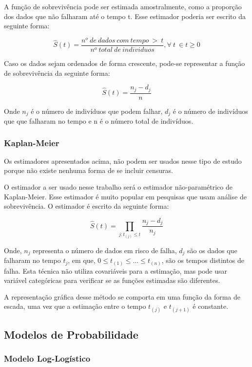 \documentclass[a4paper,12pt]{article}
\begin{document}
A função de sobrevivência pode ser estimada amostralmente, como a proporção dos dados que não falharam até o tempo t. Esse estimador poderia ser escrito da seguinte forma:

$$ \hat{S}(t) = \dfrac{n^o \ de \ dados \ com \ tempo \ > \ t}{n^o \ total \ de \ individuos}, \forall \ t \ \in t\ge 0$$

Caso os dados sejam ordenados de forma crescente, pode-se representar a função de sobrevivência da seguinte forma:

$$ \hat{S}(t) = \dfrac{n_j - d_j}{n} $$

Onde $n_j$ é o número de indivíduos que podem falhar, $d_j$ é o número de indivíduos que que falharam no tempo e n é o número total de indivíduos.

\subsubsection{Kaplan-Meier}

Os estimadores apresentados acima, não podem ser usados nesse tipo de estudo porque não existe nenhuma forma de se incluir censuras.

O estimador a ser usado nesse trabalho será o estimador não-paramétrico de Kaplan-Meier. Esse estimador é muito popular em pesquisas que usam análise de sobrevivência. O estimador é escrito da seguinte forma:

$$ \hat{S}(t) = \prod_{j:t_{(j)}\le t} \dfrac{n_j - d_j}{n_j}$$

Onde, $n_j$ representa o número de dados em risco de falha, $d_j$ são os dados que falharam no tempo $t_j$, em que, $0 \le t_{(1)} \le \hdots \le t_{(n)}$, são os tempos distintos de falha. Esta técnica não utiliza covariáveis para a estimação, mas pode usar variável categóricas para verificar se as funções estimadas são diferentes. 

A representação gráfica desse método se comporta em uma função da forma de escada, uma vez que a estimação entre o tempo $t_{(j)}$ e $t_{(j+1)}$ é constante.


\subsection{Modelos de Probabilidade}

\subsubsection{Modelo Log-Logístico}
\end{document}
